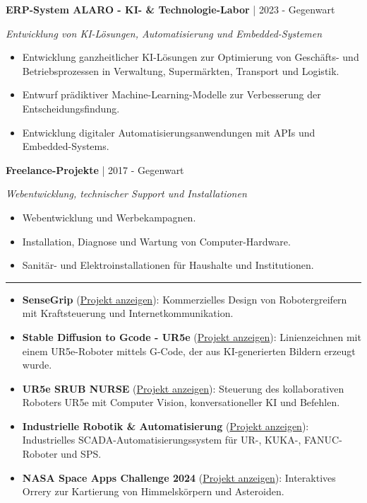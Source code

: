 \documentclass[10pt,letterpaper]{article}
\newcommand{\sectionline}{\vspace{-2pt}\textcolor{accent}{\rule{\linewidth}{0.8pt}}\vspace{1pt}}
\newcommand{\cvsection}[1]{\vspace{5pt}{\large\bfseries\textcolor{navy}{#1}}\par\sectionline}
\newcommand{\entry}[3]{\textbf{#1} \textcolor{muted}{| #2}\par\textit{#3}\par}
\newcommand{\projectlink}[1]{\href{#1}{Projekt anzeigen}}
\begin{document}
\entry{ERP-System ALARO - KI- \& Technologie-Labor}{2023 - Gegenwart}{Entwicklung von KI-L\"{o}sungen, Automatisierung und Embedded-Systemen}
\begin{itemize}
  \item Entwicklung ganzheitlicher KI-L\"{o}sungen zur Optimierung von Gesch\"{a}fts- und Betriebsprozessen in Verwaltung, Superm\"{a}rkten, Transport und Logistik.
  \item Entwurf pr\"{a}diktiver Machine-Learning-Modelle zur Verbesserung der Entscheidungsfindung.
  \item Entwicklung digitaler Automatisierungsanwendungen mit APIs und Embedded-Systems.
\end{itemize}

\entry{Freelance-Projekte}{2017 - Gegenwart}{Webentwicklung, technischer Support und Installationen}
\begin{itemize}
  \item Webentwicklung und Werbekampagnen.
  \item Installation, Diagnose und Wartung von Computer-Hardware.
  \item Sanit\"{a}r- und Elektroinstallationen f\"{u}r Haushalte und Institutionen.
\end{itemize}

\cvsection{Herausragende akademische Projekte}
\begin{itemize}
  \item \textbf{\textmu{}SenseGrip} (\projectlink{https://jphajp.github.io/JPHAJP/\#proyectos}): Kommerzielles Design von Robotergreifern mit Kraftsteuerung und Internetkommunikation.
  \item \textbf{Stable Diffusion to Gcode - UR5e} (\projectlink{https://github.com/JPHAJP/StableDiffusion_t_gcode}): Linienzeichnen mit einem UR5e-Roboter mittels G-Code, der aus KI-generierten Bildern erzeugt wurde.
  \item \textbf{UR5e SRUB NURSE} (\projectlink{https://jphajp.github.io/UR5_SRUB_NURSE/}): Steuerung des kollaborativen Roboters UR5e mit Computer Vision, konversationeller KI und Befehlen.
  \item \textbf{Industrielle Robotik \& Automatisierung} (\projectlink{https://jphajp.github.io/JPHAJP/Web/projects/4\%20-\%20PLC/All\%20SCADA.pdf}): Industrielles SCADA-Automatisierungssystem f\"{u}r UR-, KUKA-, FANUC-Roboter und SPS.
  \item \textbf{NASA Space Apps Challenge 2024} (\projectlink{https://jphajp.github.io/JPHAJP/Web/projects/1\%20-\%20Nasa/template_project.html}): Interaktives Orrery zur Kartierung von Himmelsk\"{o}rpern und Asteroiden.
\end{itemize}
\end{document}
